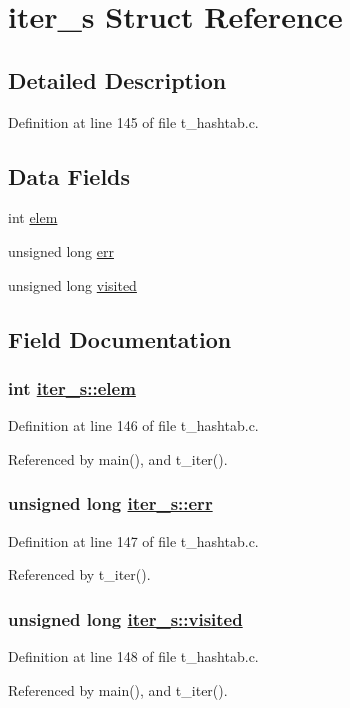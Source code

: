 \hypertarget{structiter__s}{
\section{iter\_\-s Struct Reference}
\label{structiter__s}
}


\subsection{Detailed Description}




Definition at line 145 of file t\_\-hashtab.c.\subsection*{Data Fields}
\begin{CompactItemize}
\item 
int \hyperlink{structiter__s_o0}{elem}
\item 
unsigned long \hyperlink{structiter__s_o1}{err}
\item 
unsigned long \hyperlink{structiter__s_o2}{visited}
\end{CompactItemize}


\subsection{Field Documentation}
\hypertarget{structiter__s_o0}{
\subsubsection[elem]{\setlength{\rightskip}{0pt plus 5cm}int \hyperlink{structiter__s_o0}{iter\_\-s::elem}}}
\label{structiter__s_o0}




Definition at line 146 of file t\_\-hashtab.c.

Referenced by main(), and t\_\-iter().\hypertarget{structiter__s_o1}{
\subsubsection[err]{\setlength{\rightskip}{0pt plus 5cm}unsigned long \hyperlink{structiter__s_o1}{iter\_\-s::err}}}
\label{structiter__s_o1}




Definition at line 147 of file t\_\-hashtab.c.

Referenced by t\_\-iter().\hypertarget{structiter__s_o2}{
\subsubsection[visited]{\setlength{\rightskip}{0pt plus 5cm}unsigned long \hyperlink{structiter__s_o2}{iter\_\-s::visited}}}
\label{structiter__s_o2}




Definition at line 148 of file t\_\-hashtab.c.

Referenced by main(), and t\_\-iter().